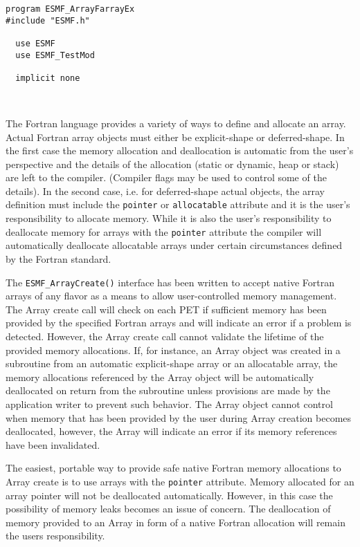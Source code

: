 
 \begin{verbatim}
program ESMF_ArrayFarrayEx
#include "ESMF.h"

  use ESMF
  use ESMF_TestMod
  
  implicit none
  
 
\end{verbatim}
 

   The Fortran language provides a variety of ways to define and allocate
   an array. Actual Fortran array objects must either be explicit-shape or
   deferred-shape. In the first case the memory allocation and deallocation is 
   automatic from the user's perspective and the details of the allocation 
   (static or dynamic, heap or stack) are left to the compiler. (Compiler flags
   may be used to control some of the details). In the second case, i.e. for 
   deferred-shape actual objects, the array definition must include the {\tt pointer} 
   or {\tt allocatable} attribute and it is the user's responsibility to allocate 
   memory. While it is also the user's responsibility to deallocate memory for
   arrays with the {\tt pointer} attribute the compiler will automatically deallocate
   allocatable arrays under certain circumstances defined by the Fortran
   standard.
  
   The {\tt ESMF\_ArrayCreate()} interface has been written to accept native
   Fortran arrays of any flavor as a means to allow user-controlled memory
   management. The Array create call will check on each PET if sufficient 
   memory has been provided by the specified Fortran arrays and will indicate 
   an error if a problem is detected. However, the Array create call cannot
   validate the lifetime of the provided memory allocations. If, for instance,
   an Array object was created in a subroutine from an automatic explicit-shape
   array or an allocatable array, the memory allocations referenced by the Array 
   object will be automatically deallocated on return from the subroutine unless
   provisions are made by the application writer to prevent such behavior. The
   Array object cannot control when memory that has been provided by the user
   during Array creation becomes deallocated, however, the Array will indicate
   an error if its memory references have been invalidated. 
 
   The easiest, portable way to provide safe native Fortran memory allocations
   to Array create is to use arrays with the {\tt pointer} attribute. Memory allocated
   for an array pointer will not be deallocated automatically. However, in this
   case the possibility of memory leaks becomes an issue of concern. The 
   deallocation of memory provided to an Array in form of a native Fortran
   allocation will remain the users responsibility.
   

